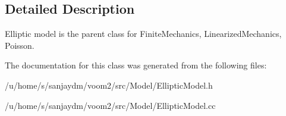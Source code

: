 \subsection{Detailed Description}
Elliptic model is the parent class for FiniteMechanics, LinearizedMechanics, Poisson. 

The documentation for this class was generated from the following files:\begin{DoxyCompactItemize}
\item 
/u/home/s/sanjaydm/voom2/src/Model/EllipticModel.h\item 
/u/home/s/sanjaydm/voom2/src/Model/EllipticModel.cc\end{DoxyCompactItemize}
